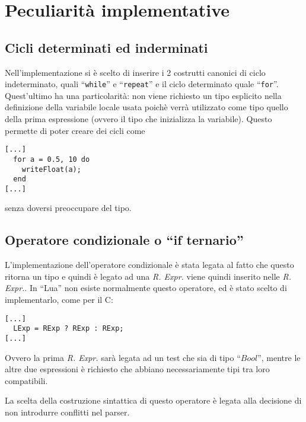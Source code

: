 \documentclass{article}
\begin{document}
\section{Peculiarità implementative}
\subsection*{Cicli determinati ed inderminati}
Nell'implementazione si è scelto di inserire i 2 costrutti canonici di ciclo indeterminato, quali ``\texttt{while}''
e ``\texttt{repeat}'' e  il ciclo determinato quale ``\texttt{for}''. Quest'ultimo ha una particolarità: non viene
richiesto un tipo esplicito nella definizione della variabile locale usata poichè verrà utilizzato
come tipo quello della prima espressione (ovvero il tipo che inizializza la variabile). Questo permette di poter 
creare dei cicli come

\begin{verbatim}
[...]
  for a = 0.5, 10 do
    writeFloat(a);  
  end
[...]
\end{verbatim}
senza doversi preoccupare del tipo.
\subsection*{Operatore condizionale o ``if ternario''}
L'implementazione dell'operatore condizionale è stata legata al fatto che questo ritorna un tipo e quindi è legato ad una
\textit{R. Expr.} viene quindi inserito nelle \textit{R. Expr.}. In ``Lua'' non esiste normalmente questo operatore, ed è
stato scelto di implementarlo, come per il C:
\begin{verbatim}
[...]
  LExp = RExp ? RExp : RExp;
[...]
\end{verbatim}
Ovvero la prima \textit{R. Expr.} sarà legata ad un test che sia di tipo ``$Bool$'', mentre le altre due espressioni è richiesto 
che abbiano necessariamente tipi tra loro compatibili.

La scelta della costruzione sintattica di questo operatore è legata alla decisione di non introdurre conflitti nel parser.
\end{document}
